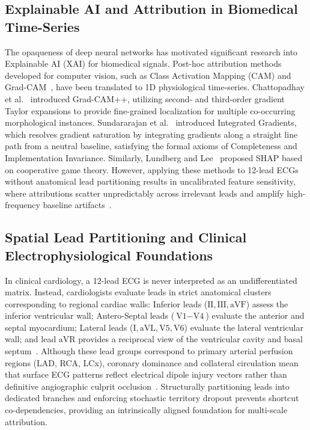 \documentclass[5p,twocolumn,10pt]{elsarticle}
\begin{document}
\subsection{Explainable AI and Attribution in Biomedical Time-Series}
The opaqueness of deep neural networks has motivated significant research into Explainable AI (XAI) for biomedical signals. Post-hoc attribution methods developed for computer vision, such as Class Activation Mapping (CAM) and Grad-CAM~\cite{selvaraju2017grad}, have been translated to 1D physiological time-series. Chattopadhay et al.~\cite{chattopadhay2018grad} introduced Grad-CAM++, utilizing second- and third-order gradient Taylor expansions to provide fine-grained localization for multiple co-occurring morphological instances. Sundararajan et al.~\cite{sundararajan2017axiomatic} introduced Integrated Gradients, which resolves gradient saturation by integrating gradients along a straight line path from a neutral baseline, satisfying the formal axioms of Completeness and Implementation Invariance. Similarly, Lundberg and Lee~\cite{lundberg2017unified} proposed SHAP based on cooperative game theory. However, applying these methods to 12-lead ECGs without anatomical lead partitioning results in uncalibrated feature sensitivity, where attributions scatter unpredictably across irrelevant leads and amplify high-frequency baseline artifacts~\cite{ismail2020benchmarking, tonekaboni2020went}.

\subsection{Spatial Lead Partitioning and Clinical Electrophysiological Foundations}
In clinical cardiology, a 12-lead ECG is never interpreted as an undifferentiated matrix. Instead, cardiologists evaluate leads in strict anatomical clusters corresponding to regional cardiac walls: Inferior leads ($\text{II}, \text{III}, \text{aVF}$) assess the inferior ventricular wall; Antero-Septal leads ($\text{V1}-\text{V4}$) evaluate the anterior and septal myocardium; Lateral leads ($\text{I}, \text{aVL}, \text{V5}, \text{V6}$) evaluate the lateral ventricular wall; and lead $\text{aVR}$ provides a reciprocal view of the ventricular cavity and basal septum~\cite{wagner2020ptb, wagner2009aha}. Although these lead groups correspond to primary arterial perfusion regions (LAD, RCA, LCx), coronary dominance and collateral circulation mean that surface ECG patterns reflect electrical dipole injury vectors rather than definitive angiographic culprit occlusion~\cite{wagner2009aha}. Structurally partitioning leads into dedicated branches and enforcing stochastic territory dropout prevents shortcut co-dependencies, providing an intrinsically aligned foundation for multi-scale attribution.
\end{document}
